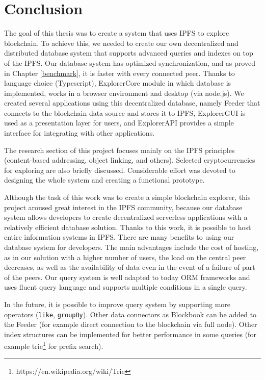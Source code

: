 \chapter{Conclusion}
\label{Conclusion}
The goal of this thesis was to create a system that uses IPFS to explore blockchain. To achieve this, we needed to create our own decentralized and distributed database system that supports advanced queries and indexes on top of the IPFS. Our database system has optimized synchronization, and as proved in Chapter \ref{benchmark}, it is faster with every connected peer. Thanks to language choice (Typescript), ExplorerCore module in which database is implemented, works in a browser environment and desktop (via node.js). We created several applications using this decentralized database, namely Feeder that connects to the blockchain data source and stores it to IPFS, ExplorerGUI is used as a presentation layer for users, and ExplorerAPI provides a simple interface for integrating with other applications.

The research section of this project focuses mainly on the IPFS principles (content-based addressing, object linking, and others). Selected cryptocurrencies for exploring are also briefly discussed. Considerable effort was devoted to designing the whole system and creating a functional prototype.

Although the task of this work was to create a simple blockchain explorer, this project aroused great interest in the IPFS community, because our database system allows developers to create decentralized serverless applications with a relatively efficient database solution. Thanks to this work, it is possible to host entire information systems in IPFS. There are many benefits to using our database system for developers. The main advantages include the cost of hosting, as in our solution with a higher number of users, the load on the central peer decreases, as well as the availability of data even in the event of a failure of part of the peers. Our query system is well adapted to today ORM frameworks and uses fluent query language and supports multiple conditions in a single query. 

In the future, it is possible to improve query system by supporting more operators (\texttt{like}, \texttt{groupBy}). Other data connectors as Blockbook can be added to the Feeder (for example direct connection to the blockchain via full node). Other index structures can be implemented for better performance in some queries (for example trie\footnote{https://en.wikipedia.org/wiki/Trie} for prefix search).



 